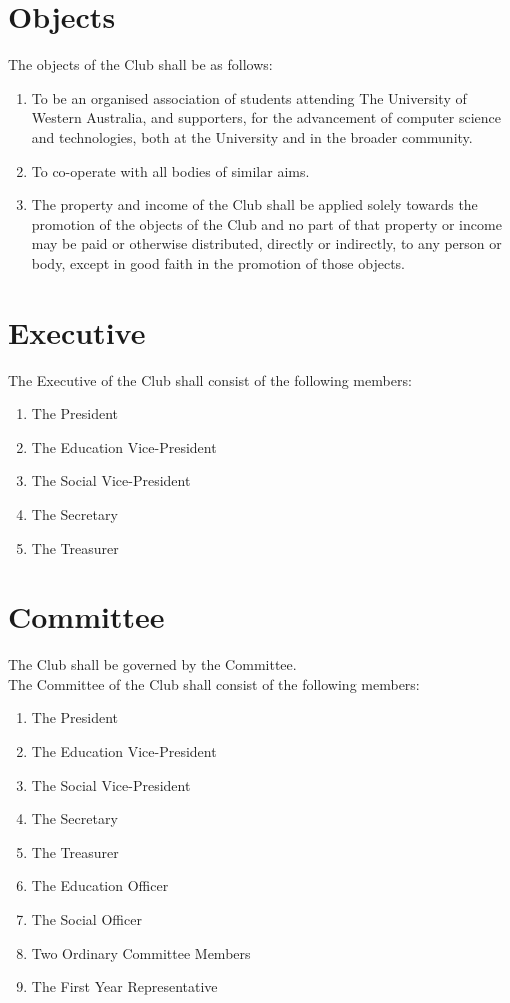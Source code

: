 \documentclass[11pt]{article} %
\begin{document}
\section{Objects}
The objects of the Club shall be as follows:
\begin{enumerate}
	\item To be an organised association of students attending The University of Western Australia, and supporters, for the advancement of computer science and technologies, both at the University and in the broader community.
	\item To co-operate with all bodies of similar aims.
	\item The property and income of the Club shall be applied solely towards the promotion of the objects of the Club and no part of that property or income may be paid or otherwise distributed, directly or indirectly, to any person or body, except in good faith in the promotion of those objects.
\end{enumerate}

\section{Executive}
The Executive of the Club shall consist of the following members:
\begin{enumerate}
	\item The President
	\item The Education Vice-President
	\item The Social Vice-President
	\item The Secretary
	\item The Treasurer
\end{enumerate}

\section{Committee}
The Club shall be governed by the Committee.\\
The Committee of the Club shall consist of the following members:
\begin{enumerate}
	\item The President
	\item The Education Vice-President
	\item The Social Vice-President
	\item The Secretary
	\item The Treasurer
	\item The Education Officer
	\item The Social Officer
	\item Two Ordinary Committee Members
	\item The First Year Representative
\end{enumerate}
\end{document}
